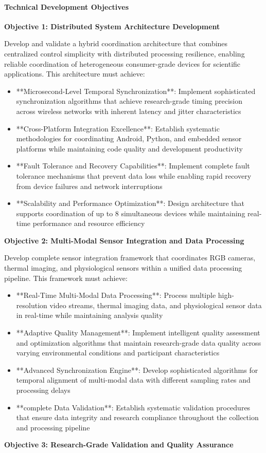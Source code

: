 \documentclass[11pt,a4paper]{article}
\begin{document}
\paragraph{Technical Development Objectives}

\textbf{Objective 1: Distributed System Architecture Development}

Develop and validate a hybrid coordination architecture that combines centralized
control simplicity with distributed
processing resilience, enabling reliable coordination of heterogeneous consumer-grade
devices for scientific
applications. This architecture must achieve:

\begin{itemize}
\item **Microsecond-Level Temporal Synchronization**: Implement sophisticated synchronization algorithms that achieve
  research-grade timing precision across wireless networks with inherent latency and
  jitter characteristics
\item **Cross-Platform Integration Excellence**: Establish systematic methodologies for coordinating Android, Python, and
  embedded sensor platforms while maintaining code quality and development productivity
\item **Fault Tolerance and Recovery Capabilities**: Implement complete fault tolerance mechanisms that prevent data
  loss while enabling rapid recovery from device failures and network interruptions
\item **Scalability and Performance Optimization**: Design architecture that supports coordination of up to 8 simultaneous
  devices while maintaining real-time performance and resource efficiency

\end{itemize}
\textbf{Objective 2: Multi-Modal Sensor Integration and Data Processing}

Develop complete sensor integration framework that coordinates RGB cameras, thermal
imaging, and physiological
sensors within a unified data processing pipeline. This framework must achieve:

\begin{itemize}
\item **Real-Time Multi-Modal Data Processing**: Process multiple high-resolution video streams, thermal imaging data, and
  physiological sensor data in real-time while maintaining analysis quality
\item **Adaptive Quality Management**: Implement intelligent quality assessment and optimization algorithms that maintain
  research-grade data quality across varying environmental conditions and participant
  characteristics
\item **Advanced Synchronization Engine**: Develop sophisticated algorithms for temporal alignment of multi-modal data with
  different sampling rates and processing delays
\item **complete Data Validation**: Establish systematic validation procedures that ensure data integrity and research
  compliance throughout the collection and processing pipeline

\end{itemize}
\textbf{Objective 3: Research-Grade Validation and Quality Assurance}
\end{document}
